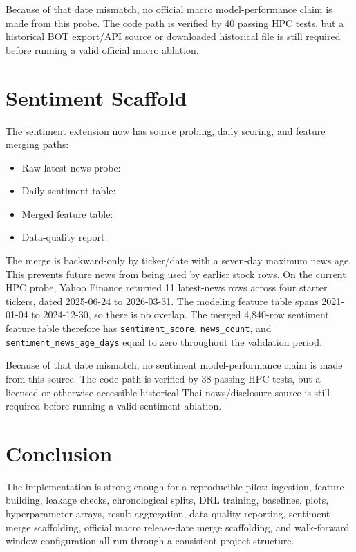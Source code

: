 \documentclass[11pt]{article}
\begin{document}
Because of that date mismatch, no official macro model-performance claim is made from this probe. The code path is verified by 40 passing HPC tests, but a historical BOT export/API source or downloaded historical file is still required before running a valid official macro ablation.

\section{Sentiment Scaffold}
The sentiment extension now has source probing, daily scoring, and feature merging paths:
\begin{itemize}
\item Raw latest-news probe: 
\item Daily sentiment table: 
\item Merged feature table: 
\item Data-quality report: 
\end{itemize}

The merge is backward-only by ticker/date with a seven-day maximum news age. This prevents future news from being used by earlier stock rows. On the current HPC probe, Yahoo Finance returned 11 latest-news rows across four starter tickers, dated 2025-06-24 to 2026-03-31. The modeling feature table spans 2021-01-04 to 2024-12-30, so there is no overlap. The merged 4,840-row sentiment feature table therefore has \texttt{sentiment\_score}, \texttt{news\_count}, and \texttt{sentiment\_news\_age\_days} equal to zero throughout the validation period.

Because of that date mismatch, no sentiment model-performance claim is made from this source. The code path is verified by 38 passing HPC tests, but a licensed or otherwise accessible historical Thai news/disclosure source is still required before running a valid sentiment ablation.

\section{Conclusion}
The implementation is strong enough for a reproducible pilot: ingestion, feature building, leakage checks, chronological splits, DRL training, baselines, plots, hyperparameter arrays, result aggregation, data-quality reporting, sentiment merge scaffolding, official macro release-date merge scaffolding, and walk-forward window configuration all run through a consistent project structure.
\end{document}

